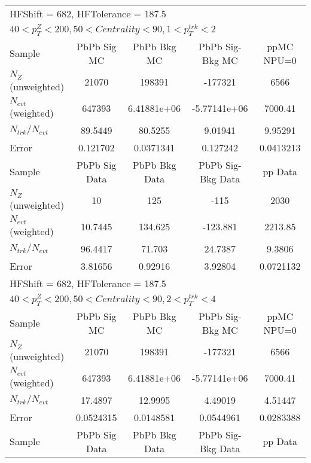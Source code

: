 \clearpage
\begin{table}[h!]
\centering
\begin{tabular}{|l|c|c|c|c|}
\multicolumn{5}{l}{ HFShift = 682, HFTolerance = 187.5}\\
\multicolumn{5}{l}{ $40 < p_{T}^{Z} < 200, 50 < Centrality < 90, 1 < p_{T}^{trk} < 2$}\\
\hline\hline
Sample         & PbPb Sig MC    & PbPb Bkg MC    & PbPb Sig-Bkg MC& ppMC NPU=0     \\
$N_Z$ (unweighted)& 21070          & 198391         & -177321        & 6566           \\
$N_{evt}$ (weighted)& 647393         & 6.41881e+06    & -5.77141e+06   & 7000.41        \\
$N_{trk}/N_{evt}$& 89.5449        & 80.5255        & 9.01941        & 9.95291        \\
Error          & 0.121702       & 0.0371341      & 0.127242       & 0.0413213      \\
\hline
Sample         & PbPb Sig Data  & PbPb Bkg Data  & PbPb Sig-Bkg Data& pp Data  \\
$N_Z$ (unweighted)& 10             & 125            & -115           & 2030           \\
$N_{evt}$ (weighted)& 10.7445        & 134.625        & -123.881       & 2213.85        \\
$N_{trk}/N_{evt}$& 96.4417        & 71.703         & 24.7387        & 9.3806         \\
Error          & 3.81656        & 0.92916        & 3.92804        & 0.0721132      \\
\hline\hline
\multicolumn{5}{l}{ HFShift = 682, HFTolerance = 187.5}\\
\multicolumn{5}{l}{ $40 < p_{T}^{Z} < 200, 50 < Centrality < 90, 2 < p_{T}^{trk} < 4$}\\
\hline\hline
Sample         & PbPb Sig MC    & PbPb Bkg MC    & PbPb Sig-Bkg MC& ppMC NPU=0     \\
$N_Z$ (unweighted)& 21070          & 198391         & -177321        & 6566           \\
$N_{evt}$ (weighted)& 647393         & 6.41881e+06    & -5.77141e+06   & 7000.41        \\
$N_{trk}/N_{evt}$& 17.4897        & 12.9995        & 4.49019        & 4.51447        \\
Error          & 0.0524315      & 0.0148581      & 0.0544961      & 0.0283388      \\
\hline
Sample         & PbPb Sig Data  & PbPb Bkg Data  & PbPb Sig-Bkg Data& pp Data  \\

\end{tabular}
\end{table}
